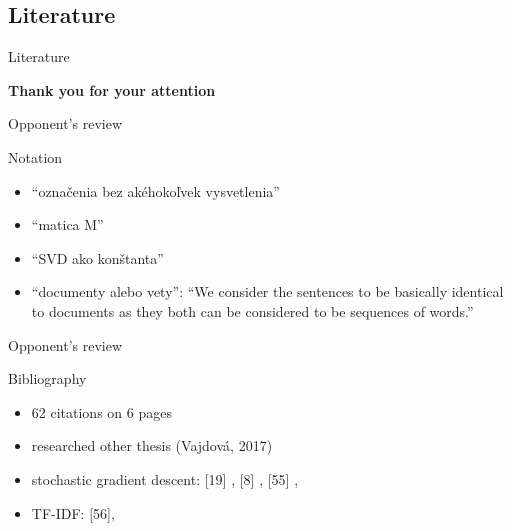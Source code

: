 \documentclass[xcolor={table}]{beamer}
\begin{document}
\subsection{Literature}                
\begin{frame}[allowframebreaks]{Literature}
\footnotesize
    \nocite{*}
    
     
\end{frame}

\begin{frame}
    \vfill
    \begin{center}
        \huge\bfseries
        Thank you for your attention
        \vfill
    \end{center}
    \vfill
\end{frame}

\appendix



\begin{frame}{Opponent's review}
    \begin{block}{Notation}
        \begin{itemize}   
            \item ``označenia bez akéhokoľvek vysvetlenia''
            \item ``matica M'' %
            \item ``SVD ako konštanta''

            \item ``documenty alebo vety'': ``We consider the sentences to be basically identical to documents as they both
can be considered to be sequences of words.''        
             
        \end{itemize}
    \end{block}
\end{frame} 

\begin{frame}{Opponent's review}
    \begin{block}{Bibliography}
        \begin{itemize}   
            \item 62 citations on 6 pages
            \item researched other thesis (Vajdová, 2017)
            \item stochastic gradient descent: [19] \cite{Goodfellow-et-al-2016},  [8] \cite{bottou-bousquet-2008},
            [55] \cite{rumelhart1986david},  %
            \item TF-IDF: [56], \cite{salton1988term}
        \end{itemize}
    \end{block}
\end{frame} 
\end{document}
